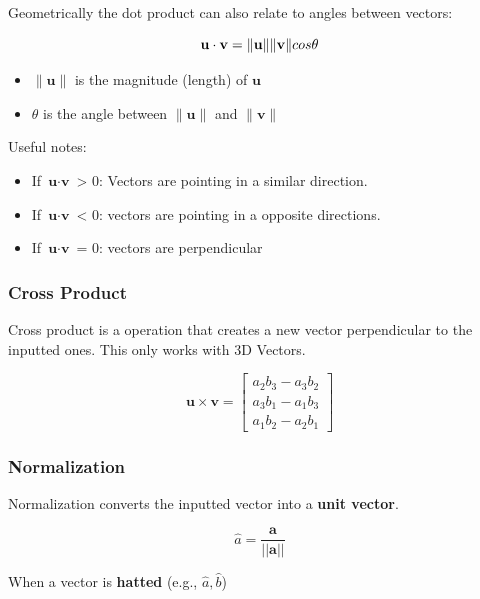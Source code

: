 \documentclass[12pt]{article}
\begin{document}
            Geometrically the dot product can also relate to angles between vectors:

            \begin{equation}
                \textbf{u} \cdot \textbf{v} = \|\textbf{u}\| \|\textbf{v}\|\\cos\theta
            \end{equation}

            \begin{itemize}
                \item $\|\textbf{u}\|$ is the magnitude (length) of $\textbf{u}$
                \item $\theta$ is the angle between $\|\textbf{u}\|$ and $\|\textbf{v}\|$
            \end{itemize}

            Useful notes:

            \begin{itemize}
                \item If $\textbf{u} \cdot \textbf{v}$ 
                    > 0: Vectors are pointing in a similar direction.
                \item If $\textbf{u} \cdot \textbf{v}$ 
                    < 0: vectors are pointing in a opposite directions.
                \item If $\textbf{u} \cdot \textbf{v}$ 
                    = 0: vectors are perpendicular
            \end{itemize}

        \subsubsection{Cross Product}
            Cross product is a operation that creates a new vector perpendicular to the inputted ones. This only works with 3D Vectors.

            \begin{equation}
                \textbf{u} × \textbf{v} = \begin{bmatrix} a_2b_3 - a_3b_2 \\ a_3b_1 - a_1b_3 \\ a_1b_2 - a_2b_1 \end{bmatrix}
            \end{equation}

        \subsubsection{Normalization}
            Normalization converts the inputted vector into a \textbf{unit vector}.

            \begin{equation}
                \hat{a} = \frac{\textbf{a}}{||\textbf{a}||}
            \end{equation}

            When a vector is \textbf{hatted} (e.g., $\hat{a}, \hat{b}$)
\end{document}

